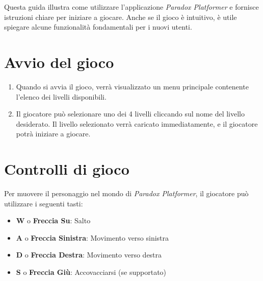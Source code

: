 \documentclass[a4paper,12pt]{report}
\begin{document}
	Questa guida illustra come utilizzare l’applicazione \textit{Paradox Platformer} e fornisce istruzioni chiare per iniziare a giocare. Anche se il gioco è intuitivo, è utile spiegare alcune funzionalità fondamentali per i nuovi utenti.
	
	\section{Avvio del gioco}
	
	\begin{enumerate}
		\item Quando si avvia il gioco, verrà visualizzato un menu principale contenente l’elenco dei livelli disponibili.
		\item Il giocatore può selezionare uno dei 4 livelli cliccando sul nome del livello desiderato. Il livello selezionato verrà caricato immediatamente, e il giocatore potrà iniziare a giocare.
	\end{enumerate}
	
	\section{Controlli di gioco}
	
	Per muovere il personaggio nel mondo di \textit{Paradox Platformer}, il giocatore può utilizzare i seguenti tasti:
	
	\begin{itemize}
		\item \textbf{W} o \textbf{Freccia Su}: Salto
		\item \textbf{A} o \textbf{Freccia Sinistra}: Movimento verso sinistra
		\item \textbf{D} o \textbf{Freccia Destra}: Movimento verso destra
		\item \textbf{S} o \textbf{Freccia Giù}: Accovacciarsi (se supportato)
	\end{itemize}
	
	
	
	
\end{document}
